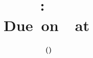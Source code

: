 \documentclass[12pt,letterpaper,titlepage,en-US]{article}
\title{
    \vspace{2in}
    \textmd{\textbf{\hmwkClassName \\\hmwkClass:\ \hmwkTitle}}\\
    \normalsize\vspace{0.1in}\small{Due\ on\ \DTMusedate{DueDate}\ at \DTMusetime{DueDate} }\\
    \vspace{0.1in}\large{\textit{\hmwkClassInstructor}}
    \vspace{3in}
}
\author{\textbf{\hmwkAuthorName\ \footnotesize{(\hmwkAuthorNetID)}} \\ \hmwkAuthorUTDEmail}
\date{}
\begin{document}
\maketitle
\tableofcontents

\pagebreak


\end{document}
